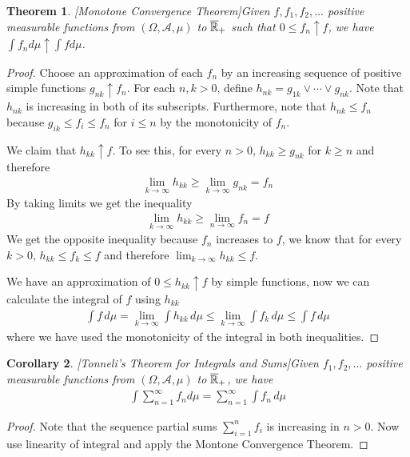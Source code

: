 \documentclass{amsart}
\newtheorem{thm}{Theorem}[section]
\newtheorem{cor}[thm]{Corollary}
\theoremstyle{remark}
\theoremstyle{definition}
\begin{document}
\begin{thm}\label{MCT}[Monotone Convergence Theorem]Given $f, f_1,
  f_2, \dots$ positive measurable functions from
  $(\Omega, \mathcal{A}, \mu)$ to $\overline{\mathbb{R}}_+$ such that $0 \leq f_n \uparrow f$, we
  have $\int f_n d \mu \uparrow \int f d \mu$.
\end{thm}
\begin{proof}Choose an approximation of each $f_n$ by an increasing
  sequence of positive simple functions $g_{nk} \uparrow f_n$.  For
  each $n,k>0$, define $h_{nk} = g_{1k} \vee \cdots \vee g_{nk}$.
  Note that $h_{nk}$ is increasing in both of its subscripts.
  Furthermore, note that $h_{nk} \leq f_n$ because $g_{ik} \leq f_{i}
  \leq f_n$ for $i \leq n$ by the monotonicity of $f_n$.

We  claim that $h_{kk} \uparrow f$.  To see this, for every $n>0$,
  $h_{kk} \geq g_{nk}$ for $k \geq n$ and therefore
\begin{align*}
\lim_{k \to \infty} h_{kk} \geq \lim_{k \to \infty} g_{nk} = f_n
\end{align*}
By taking limits we get the inequality
\begin{align*}
\lim_{k \to \infty} h_{kk} \geq \lim_{n \to \infty} f_n = f
\end{align*}
We get the opposite inequality because $f_n$ increases to $f$, we know that for
every $k>0$, $h_{kk} \leq f_k \leq f$ and therefore $\lim_{k \to
  \infty} h_{kk} \leq f$.

We have an approximation of $0 \leq h_{kk} \uparrow f$ by simple
functions, now we can calculate the integral of $f$ using $h_{kk}$
\begin{align*}
\int f \, d\mu = \lim_{k \to \infty} \int h_{kk} \, d\mu \leq \lim_{k
  \to \infty} \int f_k \, d\mu \leq \int f \, d\mu
\end{align*}
where we have used the monotonicity of the integral in both
inequalities.  
\end{proof}
\begin{cor}\label{TonelliIntegralSum}[Tonneli's Theorem for Integrals
  and Sums]Given $f_1,
  f_2, \dots$ positive measurable functions from
  $(\Omega, \mathcal{A}, \mu)$ to $\overline{\mathbb{R}}_+$, we
  have 
\begin{align*}
\int \sum_{n=1}^\infty f_n d \mu = \sum_{n=1}^\infty \int f_n \, d \mu
\end{align*}
\end{cor}
\begin{proof}Note that the sequence partial sums $\sum_{i=1}^n f_i$ is
  increasing in $n>0$.  Now use linearity of integral and apply the Montone Convergence Theorem.
\end{proof}
\end{document}

